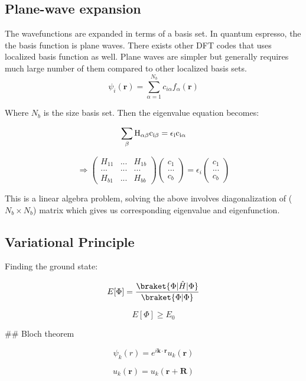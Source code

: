 \documentclass{article}
\begin{document}
\subsection{Plane-wave expansion}

The wavefunctions are expanded in terms of a basis set. In quantum espresso, the
the basis function is plane waves. There exists other DFT codes that uses
localized basis function as well. Plane waves are simpler but generally requires
much large number of them compared to other localized basis sets.\\

$$
\psi_i(\textbf{r}) = \sum_{\alpha = 1} ^{N_b} c_{i\alpha} f_{\alpha}(\textbf{r})
$$

Where $N_b$ is the size basis set. Then the eigenvalue equation becomes:

$$
\sum_{\beta} \rm{H}_{\alpha\beta} c_{i\beta} = \epsilon_i c_{i\alpha}
$$

$$
\Rightarrow
\begin{pmatrix}
H_{11} &  ... & H_{1b} \\
... & ... & ... \\
H_{b1} & ... & H_{bb}
\end{pmatrix}
\begin{pmatrix}
c_1 \\
... \\
c_b
\end{pmatrix}
= \epsilon_i
\begin{pmatrix}
c_1 \\
... \\
c_b
\end{pmatrix}
$$

This is a linear algebra problem, solving the above involves diagonalization of
($N_b \times N_b$) matrix which gives us corresponding eigenvalue and
eigenfunction.\\

\subsection{Variational Principle}
Finding the ground state:

$$
E[\Phi] = \frac{\braket{\Phi | \hat H | \Phi}}{\braket{\Phi|\Phi}}
$$

$$
E[\Phi] \ge E_0
$$

## Bloch theorem

$$
\psi_k(r) = e^{i \textbf{k} \cdot \textbf{r}} u_k(\textbf{r})
$$

$$
u_k(\textbf{r}) = u_k(\textbf{r} + \textbf{R})
$$
\end{document}
